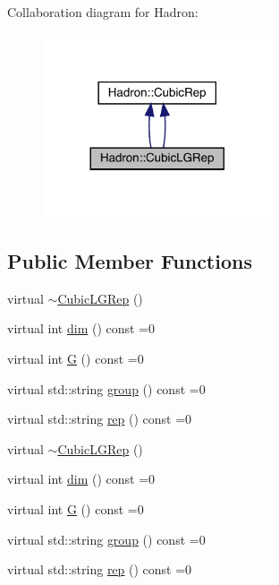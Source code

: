 Collaboration diagram for Hadron\+:\nopagebreak
\begin{figure}[H]
\begin{center}
\leavevmode
\includegraphics[width=192pt]{dd/dcc/structHadron_1_1CubicLGRep__coll__graph}
\end{center}
\end{figure}
\subsection*{Public Member Functions}
\begin{DoxyCompactItemize}
\item 
virtual \mbox{\hyperlink{structHadron_1_1CubicLGRep_a7d3ceec69cd0c1c63f11578a5a9a3ad0}{$\sim$\+Cubic\+L\+G\+Rep}} ()
\item 
virtual int \mbox{\hyperlink{structHadron_1_1CubicLGRep_a3acbaea26503ed64f20df693a48e4cdd}{dim}} () const =0
\item 
virtual int \mbox{\hyperlink{structHadron_1_1CubicLGRep_ace26f7b2d55e3a668a14cb9026da5231}{G}} () const =0
\item 
virtual std\+::string \mbox{\hyperlink{structHadron_1_1CubicLGRep_a9bdb14b519a611d21379ed96a3a9eb41}{group}} () const =0
\item 
virtual std\+::string \mbox{\hyperlink{structHadron_1_1CubicLGRep_a50f5ddbb8f4be4cee0106fa9e8c75e6c}{rep}} () const =0
\item 
virtual \mbox{\hyperlink{structHadron_1_1CubicLGRep_a7d3ceec69cd0c1c63f11578a5a9a3ad0}{$\sim$\+Cubic\+L\+G\+Rep}} ()
\item 
virtual int \mbox{\hyperlink{structHadron_1_1CubicLGRep_a3acbaea26503ed64f20df693a48e4cdd}{dim}} () const =0
\item 
virtual int \mbox{\hyperlink{structHadron_1_1CubicLGRep_ace26f7b2d55e3a668a14cb9026da5231}{G}} () const =0
\item 
virtual std\+::string \mbox{\hyperlink{structHadron_1_1CubicLGRep_a9bdb14b519a611d21379ed96a3a9eb41}{group}} () const =0
\item 
virtual std\+::string \mbox{\hyperlink{structHadron_1_1CubicLGRep_a50f5ddbb8f4be4cee0106fa9e8c75e6c}{rep}} () const =0
\end{DoxyCompactItemize}


